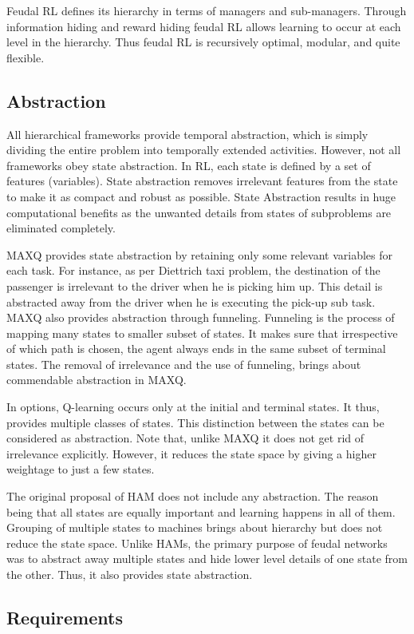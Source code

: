 Feudal RL defines its hierarchy in terms of managers and sub-managers.
Through information hiding and reward hiding feudal RL allows learning to occur at each level in the hierarchy.
Thus feudal RL is recursively optimal, modular, and quite flexible.
\subsection{Abstraction}

All hierarchical frameworks provide temporal abstraction, which is simply dividing the entire problem into temporally extended activities. However, not all frameworks obey state abstraction. In RL, each state is defined by a set of features (variables). State abstraction removes irrelevant features from the state to make it as compact and robust as possible. State Abstraction results in huge computational benefits as the unwanted details from states of subproblems are eliminated completely. 

MAXQ provides state abstraction by retaining only some relevant variables for each task. For instance, as per Diettrich taxi problem, the destination of the passenger is irrelevant to the driver when he is picking him up. This detail is abstracted away from the driver when he is executing the pick-up sub task. MAXQ also provides abstraction through funneling. Funneling is the process of mapping many states to smaller subset of states. It makes sure that irrespective of which path is chosen, the agent always ends in the same subset of terminal states. The removal of irrelevance and the use of funneling, brings about commendable abstraction in MAXQ.

In options, Q-learning occurs only at the initial and terminal states. It thus, provides multiple classes of states. This distinction between the states can be considered as abstraction. Note that, unlike MAXQ it does not get rid of irrelevance explicitly. However, it reduces the state space by giving a higher weightage to just a few states. 

The original proposal of HAM does not include any abstraction. The reason being that all states are equally important and learning happens in all of them. Grouping of multiple states to machines brings about hierarchy but does not reduce the state space. Unlike HAMs, the primary purpose of feudal networks was to abstract away multiple states and hide lower level details of one state from the other. Thus, it also provides state abstraction. 


\subsection{Requirements}

